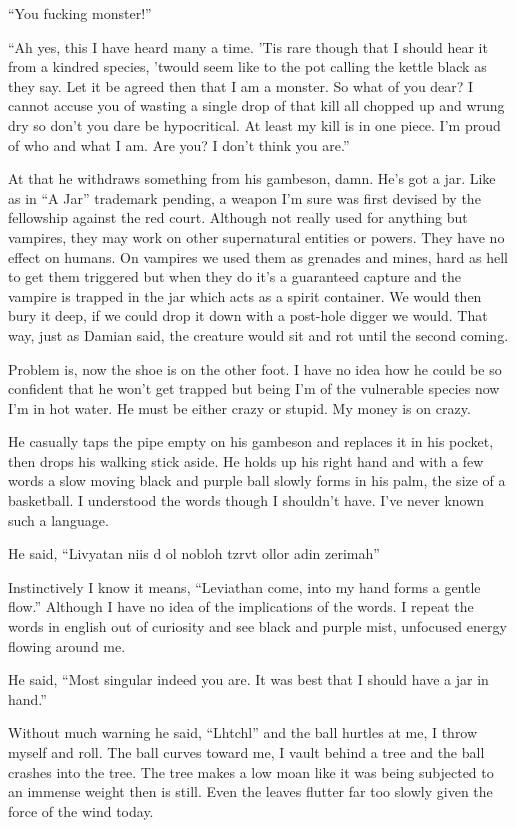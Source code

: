 ``You fucking monster!''

``Ah yes, this I have heard many a time. 'Tis rare though that I should hear it from a kindred species, 'twould seem like to the pot calling the kettle black as they say. Let it be agreed then that I am a monster. So what of you dear? I cannot accuse you of wasting a single drop of that kill all chopped up and wrung dry so don't you dare be hypocritical. At least my kill is in one piece. I'm proud of who and what I am. Are you? I don't think you are.''

At that he withdraws something from his gambeson, damn. He's got a jar. Like as in ``A Jar'' trademark pending, a weapon I'm sure was first devised by the fellowship against the red court. Although not really used for anything but vampires, they may work on other supernatural entities or powers. They have no effect on humans. On vampires we used them as grenades and mines, hard as hell to get them triggered but when they do it's a guaranteed capture and the vampire is trapped in the jar which acts as a spirit container. We would then bury it deep, if we could drop it down with a post-hole digger we would. That way, just as Damian said, the creature would sit and rot until the second coming.

Problem is, now the shoe is on the other foot. I have no idea how he could be so confident that he won't get trapped but being I'm of the vulnerable species now I'm in hot water. He must be either crazy or stupid. My money is on crazy.

He casually taps the pipe empty on his gambeson and replaces it in his pocket, then drops his walking stick aside. He holds up his right hand and with a few words a slow moving black and purple ball slowly forms in his palm, the size of a basketball. I understood the words though I shouldn't have. I've never known such a language.

He said, ``Livyatan niis d ol nobloh tzrvt ollor adin zerimah''

Instinctively I know it means, ``Leviathan come, into my hand forms a gentle flow.'' Although I have no idea of the implications of the words. I repeat the words in english out of curiosity and see black and purple mist, unfocused energy flowing around me.

He said, ``Most singular indeed you are. It was best that I should have a jar in hand.''

Without much warning he said, ``Lhtchl'' and the ball hurtles at me, I throw myself and roll. The ball curves toward me, I vault behind a tree and the ball crashes into the tree. The tree makes a low moan like it was being subjected to an immense weight then is still. Even the leaves flutter far too slowly given the force of the wind today.

